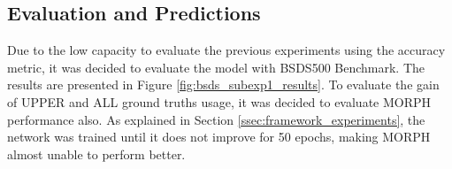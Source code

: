 % 
% 

\subsection{Evaluation and Predictions}
\label{ssec:basic_pred_eval}

Due to the low capacity to evaluate the previous experiments using the accuracy metric, it was decided to evaluate the model with BSDS500 Benchmark.
The results are presented in Figure \ref{fig:bsds_subexp1_results}. %
To evaluate the gain of UPPER and ALL ground truths usage, it was decided to evaluate MORPH performance also.
As explained in Section \ref{ssec:framework_experiments}, the network was trained until it does not improve for 50 epochs, making MORPH almost unable to perform better.

